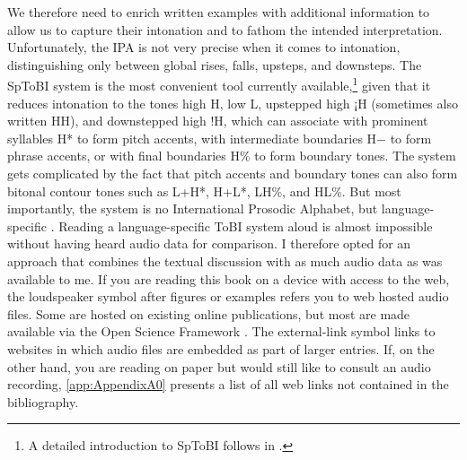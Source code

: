 We therefore need to enrich written examples with additional information to allow us to capture their intonation and to fathom the intended interpretation. Unfortunately, the \ac{IPA} is not very precise when it comes to intonation, distinguishing only between global rises, falls, upsteps, and downsteps. The \ac{SpToBI} system \citep{BeckmanETAL.2002,EstebasVilaplanaPrieto.2008,HualdePrieto2015} is the most convenient tool currently available,\footnote{A detailed introduction to \ac{SpToBI} follows in .} given that it reduces intonation to the tones high H, low L, upstepped high ¡H (sometimes also written HH), and downstepped high !H, which can associate with prominent syllables H* to form pitch accents, with intermediate boun\-da\-ries H$-$ to form phrase accents, or with final boundaries H\% to form boundary tones. The system gets complicated by the fact that pitch accents and boundary tones can also form bitonal contour tones such as L+H*, H+L*, LH\%, and HL\%. But most importantly, the system is no International Prosodic Alphabet, but language-specific \citep{HualdePrieto2016}. Reading a language-specific ToBI system aloud is almost impossible without having heard audio data for comparison. I therefore opted for an approach that combines the textual discussion with as much audio data as was available to me. If you are reading this book on a device with access to the web, the loudspeaker symbol after figures or examples {\small\faVolumeUp{}} refers you to web hosted audio files. Some are hosted on existing online publications, but most are made available via the Open Science Framework \citep{FosterDeardorff.2017}. The external-link symbol {\small\faExternalLink*{}} links to websites in which audio files are embedded as part of larger entries. If, on the other hand, you are reading on paper but would still like to consult an audio recording, \autoref{app:AppendixA0} presents a list of all web links not contained in the bibliography.
